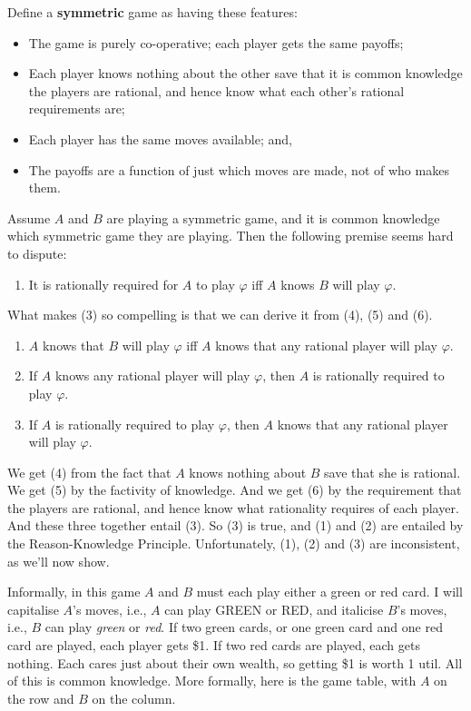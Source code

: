 Define a \textbf{symmetric} game as having these features:
\begin{itemize}
\item The game is purely co-operative; each player gets the same payoffs;
\item Each player knows nothing about the other save that it is common knowledge the players are rational, and hence know what each other's rational requirements are;
\item Each player has the same moves available; and,
\item The payoffs are a function of just which moves are made, not of who makes them.
\end{itemize}
\noindent Assume $A$ and $B$ are playing a symmetric game, and it is common knowledge which symmetric game they are playing. Then the following premise seems hard to dispute:

\begin{enumerate}
\renewcommand{\labelenumi}{(\arabic{enumi})}
\setcounter{enumi}{2}
\item It is rationally required for $A$ to play $\varphi$ iff $A$ knows $B$ will play $\varphi$.
\end{enumerate}

\noindent What makes (3) so compelling is that we can derive it from (4), (5) and (6).

\begin{enumerate}
\renewcommand{\labelenumi}{(\arabic{enumi})}
\setcounter{enumi}{3}
\item $A$ knows that $B$ will play $\varphi$ iff $A$ knows that any rational player will play $\varphi$.
\item If $A$ knows any rational player will play $\varphi$, then $A$ is rationally required to play $\varphi$.
\item If $A$ is rationally required to play $\varphi$, then $A$ knows that any rational player will play $\varphi$.
\end{enumerate}

\noindent We get (4) from the fact that $A$ knows nothing about $B$ save that she is rational. We get (5) by the factivity of knowledge. And we get (6) by the requirement that the players are rational, and hence know what rationality requires of each player. And these three together entail (3). So (3) is true, and (1) and (2) are entailed by the Reason-Knowledge Principle. Unfortunately, (1), (2) and (3) are inconsistent, as we'll now show.

Informally, in this game $A$ and $B$ must each play either a green or red card. I will capitalise $A$'s moves, i.e., $A$ can play GREEN or RED, and italicise $B$'s moves, i.e., $B$ can play \textit{green} or \textit{red}. If two green cards, or one green card and one red card are played, each player gets \$1. If two red cards are played, each gets nothing. Each cares just about their own wealth, so getting \$1 is worth 1 util. All of this is common knowledge. More formally, here is the game table, with $A$ on the row and $B$ on the column.

